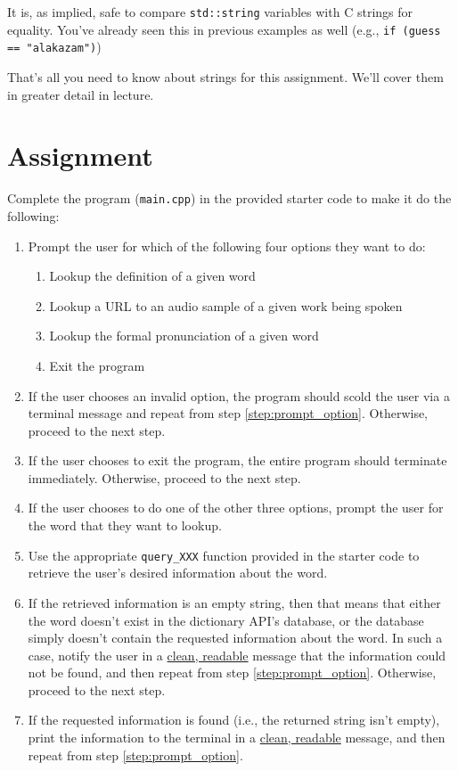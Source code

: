 \documentclass{article}
\begin{document}
It is, as implied, safe to compare \texttt{std::string} variables with C strings for equality. You've already seen this in previous examples as well (e.g., \texttt{if (guess == "alakazam")})

That's all you need to know about strings for this assignment. We'll cover them in greater detail in lecture.

\section{Assignment}

Complete the program (\texttt{main.cpp}) in the provided starter code to make it do the following:

\begin{enumerate}
    \item \label{step:prompt_option} Prompt the user for which of the following four options they want to do:
    \begin{enumerate}
        \item Lookup the definition of a given word
        \item Lookup a URL to an audio sample of a given work being spoken
        \item Lookup the formal pronunciation of a given word
        \item Exit the program
    \end{enumerate}
    \item If the user chooses an invalid option, the program should scold the user via a terminal message and repeat from step \ref{step:prompt_option}. Otherwise, proceed to the next step.
    \item If the user chooses to exit the program, the entire program should terminate immediately. Otherwise, proceed to the next step.
    \item If the user chooses to do one of the other three options, prompt the user for the word that they want to lookup.
    \item Use the appropriate \texttt{query\_XXX} function provided in the starter code to retrieve the user's desired information about the word.
    \item If the retrieved information is an empty string, then that means that either the word doesn't exist in the dictionary API's database, or the database simply doesn't contain the requested information about the word. In such a case, notify the user in a \ul{clean, readable} message that the information could not be found, and then repeat from step \ref{step:prompt_option}. Otherwise, proceed to the next step.
    \item If the requested information is found (i.e., the returned string isn't empty), print the information to the terminal in a \ul{clean, readable} message, and then repeat from step \ref{step:prompt_option}.
\end{enumerate}
\end{document}
